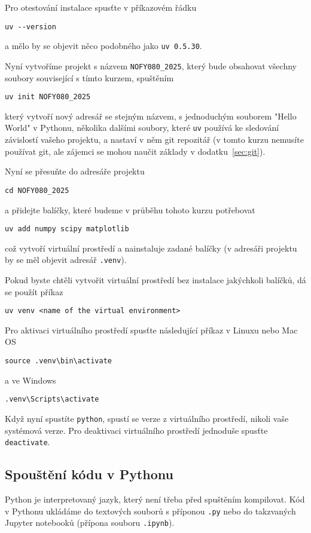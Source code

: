 Pro otestování instalace spusťte v příkazovém řádku
\begin{lstlisting}
uv --version
\end{lstlisting}
a mělo by se objevit něco podobného jako \verb|uv 0.5.30|.

Nyní vytvoříme projekt s názvem \verb|NOFY080_2025|, který bude obsahovat všechny soubory související s tímto kurzem, spuštěním
\begin{lstlisting}
uv init NOFY080_2025
\end{lstlisting}
který vytvoří nový adresář se stejným názvem, s jednoduchým souborem "Hello World" v Pythonu, několika dalšími soubory, které \verb|uv| používá ke sledování závislostí vašeho projektu, a nastaví v něm git repozitář (v tomto kurzu nemusíte používat git, ale zájemci se mohou naučit základy v dodatku~\ref{sec:git}).

Nyní se přesuňte do adresáře projektu
\begin{lstlisting}
cd NOFY080_2025
\end{lstlisting}
a přidejte balíčky, které budeme v průběhu tohoto kurzu potřebovat
\begin{lstlisting}
uv add numpy scipy matplotlib
\end{lstlisting}
což vytvoří virtuální prostředí a nainstaluje zadané balíčky (v adresáři projektu by se měl objevit adresář \verb|.venv|).

Pokud byste chtěli vytvořit virtuální prostředí bez instalace jakýchkoli balíčků, dá se použít příkaz
\begin{lstlisting}
uv venv <name of the virtual environment>
\end{lstlisting}

Pro aktivaci virtuálního prostředí spusťte následující příkaz v Linuxu nebo Mac OS
\begin{lstlisting}
source .venv\bin\activate
\end{lstlisting}
a ve Windows
\begin{lstlisting}
.venv\Scripts\activate
\end{lstlisting}

Když nyní spustíte \verb|python|, spustí se verze z virtuálního prostředí, nikoli vaše systémová verze. Pro deaktivaci virtuálního prostředí jednoduše spusťte \verb|deactivate|.

\subsection{Spouštění kódu v Pythonu}
Python je interpretovaný jazyk, který není třeba před spuštěním kompilovat. Kód v Pythonu ukládáme do textových souborů s příponou \verb|.py| nebo do takzvaných Jupyter notebooků (přípona souboru \verb|.ipynb|).

